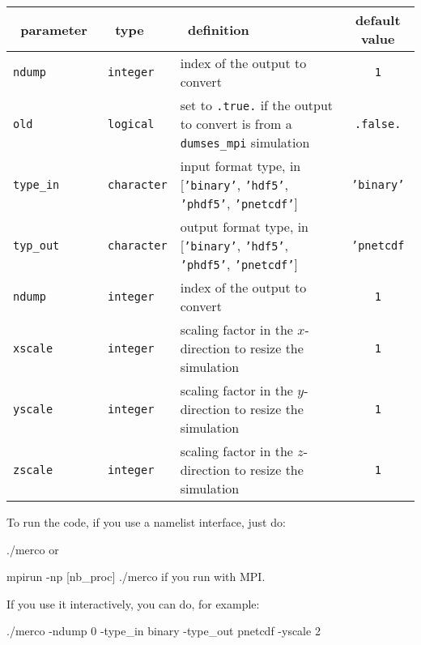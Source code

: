 \documentclass[a4paper,12pt]{article}
\newenvironment{codeblock}[2][]{%
    \minted[bgcolor=LightGray!80!white,fontsize=\small,#1]{#2}%
}{%
    \endminted%
}%
\newenvironment{codeblock}[2][]{\small\verbatim}{\endverbatim}
\begin{document}
\begin{table}[h!]
  \centering
  {\footnotesize
  \begin{tabular}{l | l | p{} | c }
    ~\hfill parameter\hfill~ & ~\hfill type\hfill~ & ~\hfill definition\hfill~ & default value \\
    \hline
    \hline
    \texttt{ndump} & \texttt{integer} & index of the output to convert & \texttt{1} \\
    \texttt{old} & \texttt{logical} & set to \texttt{.true.} if the output to convert is from a \texttt{dumses\_mpi} simulation & \texttt{.false.} \\
    \texttt{type\_in} & \texttt{character} & input format type, in [\texttt{'binary'}, \texttt{'hdf5'}, \texttt{'phdf5'}, \texttt{'pnetcdf'}] & \texttt{'binary'} \\
    \texttt{typ\_out} & \texttt{character} & output format type, in [\texttt{'binary'}, \texttt{'hdf5'}, \texttt{'phdf5'}, \texttt{'pnetcdf'}] & \texttt{'pnetcdf} \\
    \texttt{ndump} & \texttt{integer} & index of the output to convert & \texttt{1} \\
    \texttt{xscale} & \texttt{integer} & scaling factor in the $x$-direction to resize the simulation & \texttt{1} \\
    \texttt{yscale} & \texttt{integer} & scaling factor in the $y$-direction to resize the simulation & \texttt{1} \\
    \texttt{zscale} & \texttt{integer} & scaling factor in the $z$-direction to resize the simulation & \texttt{1} \\
    \hline
    \end{tabular}
  }
\end{table}

To run the code, if you use a namelist interface, just do:

\begin{codeblock}{bash}
  ./merco
\end{codeblock}
or

\begin{codeblock}{bash}
  mpirun -np [nb_proc] ./merco
\end{codeblock}
if you run with MPI.

If you use it interactively, you can do, for example:

\begin{codeblock}{bash}
  ./merco -ndump 0 -type_in binary -type_out pnetcdf -yscale 2
\end{codeblock}
\end{document}
